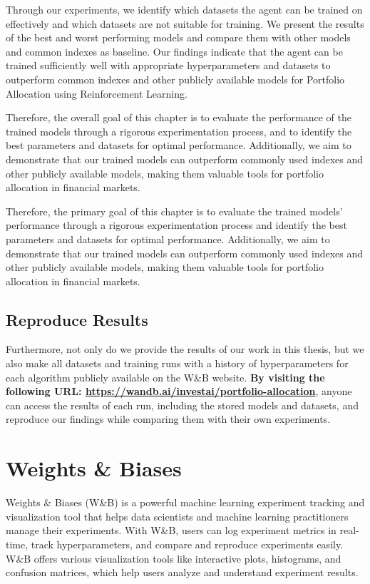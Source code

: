 \documentclass[../xlapes02]{subfiles}
\begin{document}
    Through our experiments, we identify which datasets the agent can be trained on effectively and which datasets are not suitable for training. We present the results of the best and worst performing models and compare them with other models and common indexes as baseline. Our findings indicate that the agent can be trained sufficiently well with appropriate hyperparameters and datasets to outperform common indexes and other publicly available models for Portfolio Allocation using Reinforcement Learning.

    Therefore, the overall goal of this chapter is to evaluate the performance of the trained models through a rigorous experimentation process, and to identify the best parameters and datasets for optimal performance. Additionally, we aim to demonstrate that our trained models can outperform commonly used indexes and other publicly available models, making them valuable tools for portfolio allocation in financial markets.


    Therefore, the primary goal of this chapter is to evaluate the trained models' performance through a rigorous experimentation process and identify the best parameters and datasets for optimal performance. Additionally, we aim to demonstrate that our trained models can outperform commonly used indexes and other publicly available models, making them valuable tools for portfolio allocation in financial markets.

    \subsection{Reproduce Results}
    Furthermore, not only do we provide the results of our work in this thesis, but we also make all datasets and training runs with a history of hyperparameters for each algorithm publicly available on the W\&B website. \textbf{By visiting the following URL: \url{https://wandb.ai/investai/portfolio-allocation}}, anyone can access the results of each run, including the stored models and datasets, and reproduce our findings while comparing them with their own experiments.


    \section{Weights \& Biases}\label{sec:wandb}
    Weights \& Biases (W\&B) is a powerful machine learning experiment tracking and visualization tool that helps data scientists and machine learning practitioners manage their experiments. With W\&B, users can log experiment metrics in real-time, track hyperparameters, and compare and reproduce experiments easily. W\&B offers various visualization tools like interactive plots, histograms, and confusion matrices, which help users analyze and understand experiment results.
\end{document}
